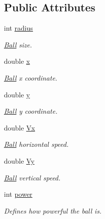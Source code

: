 \subsection*{Public Attributes}
\begin{DoxyCompactItemize}
\item 
int \hyperlink{class_ball_ab5b6ed9fe327aace1b4e4a6473838bc6}{radius}
\begin{DoxyCompactList}\small\item\em \hyperlink{class_ball}{Ball} size. \end{DoxyCompactList}\item 
\mbox{\label{class_ball_a60894aab5e27e93bacf2393b9110a049}} 
double \hyperlink{class_ball_a60894aab5e27e93bacf2393b9110a049}{x}
\begin{DoxyCompactList}\small\item\em \hyperlink{class_ball}{Ball} x coordinate. \end{DoxyCompactList}\item 
\mbox{\label{class_ball_a17d73231eab81d0e74cf28d0068fe5cb}} 
double \hyperlink{class_ball_a17d73231eab81d0e74cf28d0068fe5cb}{y}
\begin{DoxyCompactList}\small\item\em \hyperlink{class_ball}{Ball} y coordinate. \end{DoxyCompactList}\item 
\mbox{\label{class_ball_a9fa468c47ad3479e49cbff27f4bc0478}} 
double \hyperlink{class_ball_a9fa468c47ad3479e49cbff27f4bc0478}{Vx}
\begin{DoxyCompactList}\small\item\em \hyperlink{class_ball}{Ball} horizontal speed. \end{DoxyCompactList}\item 
\mbox{\label{class_ball_ad8064c1cc1d293f621bae27d173f0ca4}} 
double \hyperlink{class_ball_ad8064c1cc1d293f621bae27d173f0ca4}{Vy}
\begin{DoxyCompactList}\small\item\em \hyperlink{class_ball}{Ball} vertical speed. \end{DoxyCompactList}\item 
int \hyperlink{class_ball_a5b6d417551e2b5cddbc68566891eea46}{power}
\begin{DoxyCompactList}\small\item\em Defines how powerful the ball is. \end{DoxyCompactList}\end{DoxyCompactItemize}
